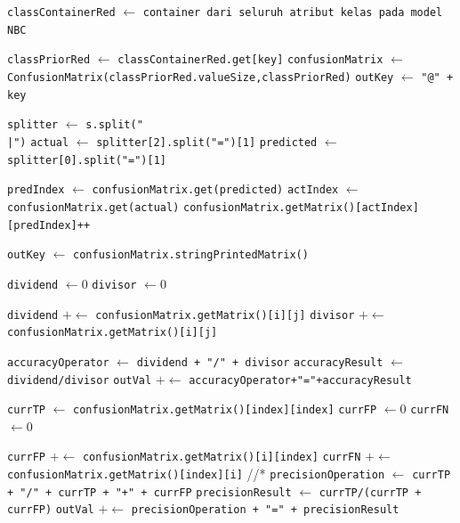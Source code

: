 \begin{enumerate}
\begin{itemize}
\begin{enumerate}
\begin{algorithm}[H]
\begin{algorithmic}[1]
			\State \texttt{classContainerRed} $\gets$ \texttt{container dari seluruh atribut kelas pada model NBC}

			\State \texttt{classPriorRed} $\gets$ \texttt{classContainerRed.get[key]}
			\State \texttt{confusionMatrix} $\gets$ \texttt{ConfusionMatrix(classPriorRed.valueSize,classPriorRed)}
			\State \texttt{outKey} $\gets$ \texttt{"@" + key}
			
				\State \texttt{splitter} $\gets$ \texttt{s.split("\\|")}
				\State \texttt{actual} $\gets$ \texttt{splitter[2].split("=")[1]}
				\State \texttt{predicted} $\gets$ \texttt{splitter[0].split("=")[1]}
				
				\State \texttt{predIndex} $\gets$ \texttt{confusionMatrix.get(predicted)}
				\State \texttt{actIndex} $\gets$ \texttt{confusionMatrix.get(actual)}
				\State \texttt{confusionMatrix.getMatrix()[actIndex][predIndex]++}
			\EndFor 
        	
        	\State \texttt{outKey} $\gets$ \texttt{confusionMatrix.stringPrintedMatrix()}
			   	
        	\State \texttt{dividend} $\gets 0$ 
			\State \texttt{divisor}	$\gets 0$
			
						\State \texttt{dividend} $+\gets$ \texttt{confusionMatrix.getMatrix()[i][j]}
					\EndIf
					\State \texttt{divisor} $+\gets$ \texttt{confusionMatrix.getMatrix()[i][j]}
				\EndFor
			\EndFor
			
			\State \texttt{accuracyOperator} $\gets$ \texttt{dividend + "/" + divisor}
			\State \texttt{accuracyResult} $\gets$ \texttt{dividend/divisor}
			\State \texttt{outVal} $+\gets$ \texttt{accuracyOperator+"="+accuracyResult}
			

				\State \texttt{currTP} $\gets$ \texttt{confusionMatrix.getMatrix()[index][index]}
				\State \texttt{currFP} $\gets 0$
				\State \texttt{currFN} $\gets 0$
				
						\State \texttt{currFP} $+\gets$ \texttt{confusionMatrix.getMatrix()[i][index]}
						\State \texttt{currFN} $+\gets$ \texttt{confusionMatrix.getMatrix()[index][i]}
					\EndIf
				\EndFor
				//*
				\State \texttt{precisionOperation} $\gets$ \texttt{currTP + "/" + currTP + "+" + currFP}
				\State \texttt{precisionResult} $\gets$ \texttt{currTP/(currTP + currFP)}
				\State \texttt{outVal} $+\gets$ \texttt{precisionOperation + "=" + precisionResult}
				

\end{algorithmic}
\end{algorithm}
\end{enumerate}
\end{itemize}
\end{enumerate}
